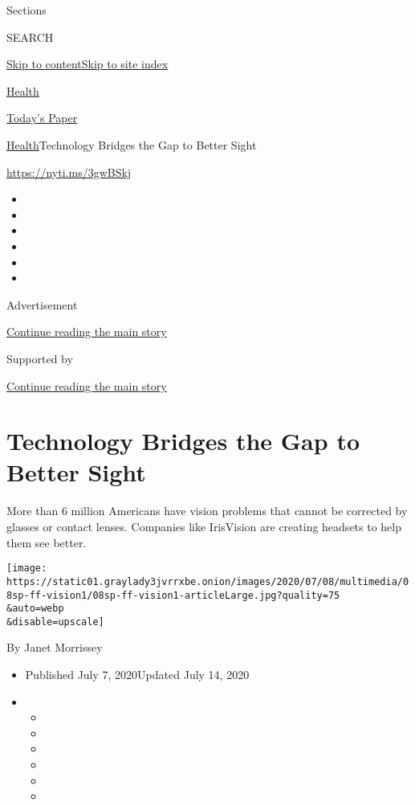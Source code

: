 Sections

SEARCH

\protect\hyperlink{site-content}{Skip to
content}\protect\hyperlink{site-index}{Skip to site index}

\href{https://www.nytimes3xbfgragh.onion/section/health}{Health}

\href{https://myaccount.nytimes3xbfgragh.onion/auth/login?response_type=cookie\&client_id=vi}{}

\href{https://www.nytimes3xbfgragh.onion/section/todayspaper}{Today's
Paper}

\href{/section/health}{Health}\textbar{}Technology Bridges the Gap to
Better Sight

\href{https://nyti.ms/3gwBSkj}{https://nyti.ms/3gwBSkj}

\begin{itemize}
\item
\item
\item
\item
\item
\item
\end{itemize}

Advertisement

\protect\hyperlink{after-top}{Continue reading the main story}

Supported by

\protect\hyperlink{after-sponsor}{Continue reading the main story}

\hypertarget{technology-bridges-the-gap-to-better-sight}{%
\section{Technology Bridges the Gap to Better
Sight}\label{technology-bridges-the-gap-to-better-sight}}

More than 6 million Americans have vision problems that cannot be
corrected by glasses or contact lenses. Companies like IrisVision are
creating headsets to help them see better.

\texttt{[image: https://static01.graylady3jvrrxbe.onion/images/2020/07/08/multimedia/08sp-ff-vision1/08sp-ff-vision1-articleLarge.jpg?quality=75\\\&auto=webp\\\&disable=upscale]}

By Janet Morrissey

\begin{itemize}
\item
  Published July 7, 2020Updated July 14, 2020
\item
  \begin{itemize}
  \item
  \item
  \item
  \item
  \item
  \item
  \end{itemize}
\end{itemize}

